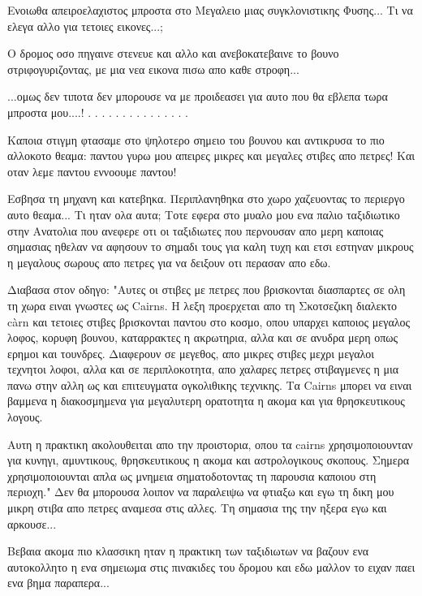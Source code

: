 Ενοιωθα απειροελαχιστος μπροστα στο Μεγαλειο μιας συγκλονιστικης Φυσης...
Τι να ελεγα αλλο για τετοιες εικονες...;


Ο δρομος οσο πηγαινε στενευε και αλλο και ανεβοκατεβαινε το βουνο στριφογυριζοντας, με μια νεα εικονα πισω απο καθε στροφη...


...ομως δεν τιποτα δεν μπορουσε να με προιδεασει για αυτο που θα εβλεπα τωρα μπροστα μου....!
.
.
.
.
.
.
.
.
.
.
.
.
.
.
.


Καποια στιγμη φτασαμε στο ψηλοτερο σημειο του βουνου και αντικρυσα το πιο αλλοκοτο θεαμα: παντου γυρω μου απειρες μικρες και μεγαλες στιβες απο πετρες! Και οταν λεμε παντου εννοουμε παντου!


Εσβησα τη μηχανη και κατεβηκα. Περιπλανηθηκα στο χωρο χαζευοντας το περιεργο αυτο θεαμα... Τι ηταν ολα αυτα; Τοτε εφερα στο μυαλο μου ενα παλιο ταξιδιωτικο στην Ανατολια που ανεφερε οτι οι ταξιδιωτες που περνουσαν απο μερη καποιας σημασιας ηθελαν να αφησουν το σημαδι τους για καλη τυχη και ετσι εστηναν μικρους η μεγαλους σωρους απο πετρες για να δειξουν οτι περασαν απο εδω.

Διαβασα στον οδηγο: "Αυτες οι στιβες με πετρες που βρισκονται διασπαρτες σε ολη τη χωρα ειναι γνωστες ως Cairns. Η λεξη προερχεται απο τη Σκοτσεζικη διαλεκτο càrn και τετοιες στιβες βρισκονται παντου στο κοσμο, οπου υπαρχει καποιος μεγαλος λοφος, κορυφη βουνου, καταρρακτες η ακρωτηρια, αλλα και σε ανυδρα μερη οπως ερημοι και τουνδρες. Διαφερουν σε μεγεθος, απο μικρες στιβες μεχρι μεγαλοι τεχνητοι λοφοι, αλλα και σε περιπλοκοτητα, απο χαλαρες πετρες στιβαγμενες η μια πανω στην αλλη ως και επιτευγματα ογκολιθικης τεχνικης. Τα Cairns μπορει να ειναι βαμμενα η διακοσμημενα για μεγαλυτερη ορατοτητα η ακομα και για θρησκευτικους λογους.

Αυτη η πρακτικη ακολουθειται απο την προιστορια, οπου τα cairns χρησιμοποιουνταν για κυνηγι, αμυντικους, θρησκευτικους η ακομα και αστρολογικους σκοπους. Σημερα χρησιμοποιουνται απλα ως μνημεια σηματοδοτοντας τη παρουσια καποιου στη περιοχη."
Δεν θα μπορουσα λοιπον να παραλειψω να φτιαξω και εγω τη δικη μου μικρη στιβα απο πετρες αναμεσα στις αλλες. Τη σημασια της την ηξερα εγω και αρκουσε...


Βεβαια ακομα πιο κλασσικη ηταν η πρακτικη των ταξιδιωτων να βαζουν ενα αυτοκολλητο η ενα σημειωμα στις πινακιδες του δρομου και εδω μαλλον το ειχαν παει ενα βημα παραπερα...

